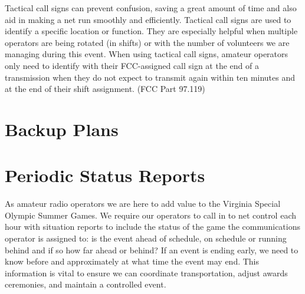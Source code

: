 \documentclass[pdflatex,letterpaper,twoside,12pt]{book}
\begin{document}
Tactical call signs can prevent confusion, saving a great amount of time and also aid in making a net run smoothly and efficiently.  Tactical call signs are used to identify a specific location or function.  They are especially helpful when multiple operators are being rotated (in shifts) or with the number of volunteers we are managing during this event.  When using tactical call signs, amateur operators only need to identify with their FCC-assigned call sign at the end of a transmission when they do not expect to transmit again within ten minutes and at the end of their shift assignment. (FCC Part 97.119) 



\section{Backup Plans}


\section{Periodic Status Reports}

As amateur radio operators we are here to add value to the Virginia Special Olympic Summer Games.  We require our operators to call in to net control each hour with situation reports to include the status of the game the communications operator is assigned to: is the event ahead of schedule, on schedule or running behind and if so how far ahead or behind?  If an event is ending early, we need to know before and approximately at what time the event may end.  This information is vital to ensure we can coordinate transportation, adjust awards ceremonies, and maintain a controlled event.

\end{document}
